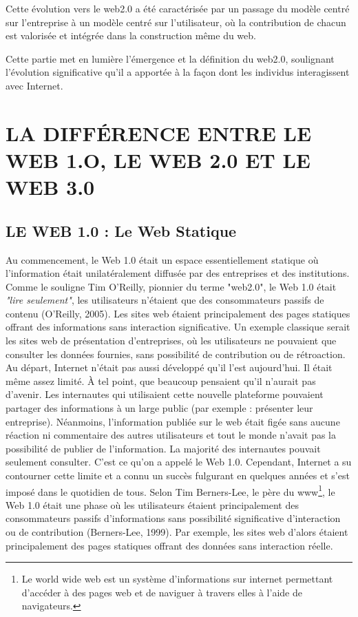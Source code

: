 \documentclass[12pt,a4paper]{article} %
\begin{document}
	Cette évolution vers le web2.0 a été caractérisée par un passage du modèle centré sur l'entreprise à un modèle centré sur l'utilisateur, où la contribution de chacun est valorisée et intégrée dans la construction même du web.
	
	Cette partie met en lumière l'émergence et la définition du web2.0, soulignant l'évolution significative qu'il a apportée à la façon dont les individus interagissent avec Internet.
	
	
	\section{\textbf{LA DIFFÉRENCE ENTRE LE WEB 1.O, LE WEB 2.0 ET LE WEB 3.0}}
	\subsection{\textbf{LE WEB 1.0 : Le Web Statique}}
	Au commencement, le Web 1.0 était un espace essentiellement statique où l'information était unilatéralement diffusée par des entreprises et des institutions. Comme le souligne Tim O’Reilly, pionnier du terme "web2.0", le Web 1.0 était \textit{"lire seulement"}, les utilisateurs n'étaient que des consommateurs passifs de contenu (O’Reilly, 2005).  
	Les sites web étaient principalement des pages statiques offrant des informations sans interaction significative. Un exemple classique serait les sites web de présentation d'entreprises, où les utilisateurs ne pouvaient que consulter les données fournies, sans possibilité de contribution ou de rétroaction. Au départ, Internet n’était pas aussi développé qu’il l’est aujourd’hui. Il était même assez limité. À tel point, que beaucoup pensaient qu’il n’aurait pas d’avenir. Les internautes qui utilisaient cette nouvelle plateforme pouvaient partager des informations à un large public (par exemple : présenter leur entreprise). Néanmoins, l’information publiée sur le web était figée sans aucune réaction ni commentaire des autres utilisateurs et tout le monde n’avait pas la possibilité de publier de l’information. La majorité des internautes pouvait seulement consulter. C’est ce qu’on a appelé le Web 1.0. Cependant, Internet a su contourner cette limite et a connu un succès fulgurant en quelques années et s’est imposé dans le quotidien de tous.
	Selon Tim Berners-Lee, le père du www\footnote[2]{Le world wide web est un système d'informations sur internet permettant d'accéder à des pages web et de naviguer à travers elles à l'aide de navigateurs.}, le Web 1.0 était une phase où les utilisateurs étaient principalement des consommateurs passifs d'informations sans possibilité significative d'interaction ou de contribution (Berners-Lee, 1999). Par exemple, les sites web d'alors étaient principalement des pages statiques offrant des données sans interaction réelle.
\end{document}
